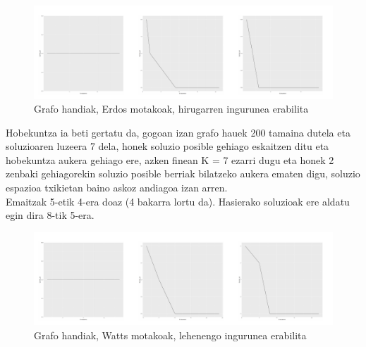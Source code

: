 \documentclass[eu,gi]{ifirak}\usepackage[]{graphicx}\usepackage[]{color}
\makeatletter
\def\maxwidth{ %
  \ifdim\Gin@nat@width>\linewidth
    \linewidth
  \else
    \Gin@nat@width
  \fi
}
\newenvironment{knitrout}{}{} %
\makeatother
\begin{document}
\begin{center}	
\begin{knitrout}
\color{fgcolor}\begin{figure}[!h]
\includegraphics[width=\maxwidth]{figure/unnamed-chunk-15-1} \caption[Grafo handiak, Erdos motakoak, hirugarren ingurunea erabilita]{Grafo handiak, Erdos motakoak, hirugarren ingurunea erabilita}\label{fig:unnamed-chunk-15}
\end{figure}


\end{knitrout}
\end{center}
Hobekuntza ia beti gertatu da, gogoan izan grafo hauek 200 tamaina dutela eta soluzioaren luzeera 7 dela, honek soluzio posible gehiago eskaitzen ditu eta hobekuntza aukera gehiago ere, azken finean K = 7 ezarri dugu eta honek 2 zenbaki gehiagorekin soluzio posible berriak bilatzeko aukera ematen digu, soluzio espazioa txikietan baino askoz andiagoa izan arren.\\
Emaitzak 5-etik 4-era doaz (4 bakarra lortu da). Hasierako soluzioak ere aldatu egin dira 8-tik 5-era. \\

\begin{center}	
\begin{knitrout}
\color{fgcolor}\begin{figure}[!h]
\includegraphics[width=\maxwidth]{figure/unnamed-chunk-16-1} \caption[Grafo handiak, Watts motakoak, lehenengo ingurunea erabilita]{Grafo handiak, Watts motakoak, lehenengo ingurunea erabilita}\label{fig:unnamed-chunk-16}
\end{figure}


\end{knitrout}
\end{center}
\end{document}
